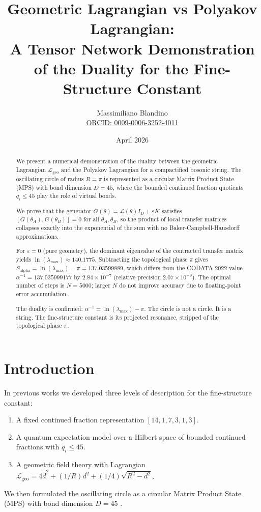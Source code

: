 \documentclass[12pt]{article}
\title{Geometric Lagrangian vs Polyakov Lagrangian: \\ A Tensor Network Demonstration of the Duality for the Fine-Structure Constant}
\author{Massimiliano Blandino \\ 
\href{https://orcid.org/0009-0006-3252-4011}{ORCID: 0009-0006-3252-4011}}
\date{April 2026}
\begin{document}
\maketitle

\begin{abstract}
We present a numerical demonstration of the duality between the geometric
Lagrangian $\mathcal{L}_{\text{geo}}$ and the Polyakov Lagrangian for a
compactified bosonic string. The oscillating circle of radius $R = \pi$ is
represented as a circular Matrix Product State (MPS) with bond dimension
$D = 45$, where the bounded continued fraction quotients $q_i \le 45$ play
the role of virtual bonds.

We prove that the generator $G(\theta) = \mathcal{L}(\theta) I_D + \varepsilon K$
satisfies $[G(\theta_A), G(\theta_B)] = 0$ for all $\theta_A, \theta_B$,
so the product of local transfer matrices collapses exactly into the
exponential of the sum with no Baker-Campbell-Hausdorff approximations.

For $\varepsilon = 0$ (pure geometry), the dominant eigenvalue of the
contracted transfer matrix yields $\ln(\lambda_{\text{max}}) \approx
140.1775$. Subtracting the topological phase $\pi$ gives
$S_{\text{alpha}} = \ln(\lambda_{\text{max}}) - \pi = 137.03599889$, which
differs from the CODATA 2022 value $\alpha^{-1} = 137.035999177$ by
$2.84\times10^{-7}$ (relative precision $2.07\times10^{-9}$). The optimal
number of steps is $N = 5000$; larger $N$ do not improve accuracy due to
floating-point error accumulation.

The duality is confirmed: $\alpha^{-1} = \ln(\lambda_{\text{max}}) - \pi$.
The circle is not a circle. It is a string. The fine-structure constant is
its projected resonance, stripped of the topological phase $\pi$.
\end{abstract}

\section{Introduction}

In previous works \cite{blandino2026a,blandino2026b,blandino2026c} we
developed three levels of description for the fine-structure constant:
\begin{enumerate}
    \item A fixed continued fraction representation $[14,1,7,3,1,3]$.
    \item A quantum expectation model over a Hilbert space of bounded
    continued fractions with $q_i \le 45$.
    \item A geometric field theory with Lagrangian
    $\mathcal{L}_{\text{geo}} = 4\dot{d}^2 + (1/R)d^2 + (1/4)\sqrt{R^2-d^2}$.
\end{enumerate}
We then formulated the oscillating circle as a circular Matrix Product State
(MPS) with bond dimension $D = 45$ \cite{verstraete2004,verstraete2006}.
\end{document}

